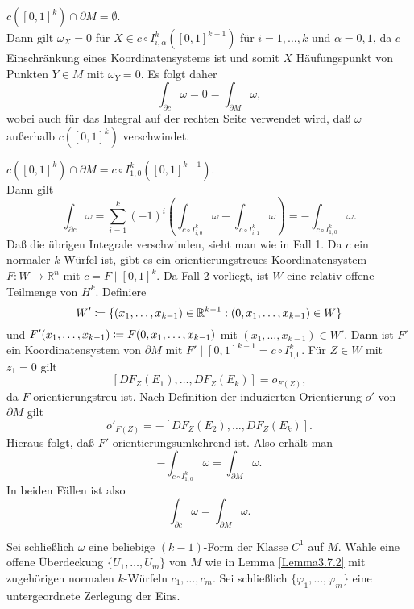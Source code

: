 \documentclass[a4paper,twoside,DIV15,BCOR12mm]{scrbook}
\begin{document}
\bigskip

 $c([0,1]^{k}) \cap \partial M = \emptyset$.\\


\noindent
Dann gilt $\omega_{X} = 0$ für $X \in c \circ 
I_{i,\alpha}^{k}([0,1]^{k-1})$ für $i = 1,\dots,k$ und $\alpha = 
0,1$, da $c$ Einschränkung eines Koordinatensystems ist und somit $X$ 
Häufungspunkt von Punkten $Y \in M$ mit $\omega_{Y} = 0$. Es folgt 
daher
\[ \int_{\partial c} \omega = 0 = \int_{\partial M} \omega, \]
wobei auch für das Integral auf der rechten Seite verwendet wird, daß
 $\omega$ außerhalb $c([0,1]^{k})$ verschwindet.

\bigskip

 $c([0,1]^{k}) \cap \partial M = c \circ 
I_{1,0}^{k}([0,1]^{k-1})$.\\

\noindent
Dann gilt
\[ \int_{\partial c} \omega = \sum_{i=1}^{k} (-1)^{i} \left(\int_{c 
\circ I_{i,0}^{k}} \omega - \int_{c \circ I_{i,1}^{k}} \omega 
\right) = -\int_{c \circ I_{1,0}^{k}} \omega. \]
Daß die übrigen Integrale verschwinden, sieht man wie in Fall 1. 
Da $c$ ein normaler $k$-Würfel ist, gibt es ein orientierungstreues 
Koordinatensystem $F: W \to {\mathbb R}^{n}$ mit $c = F \mid 
[0,1]^{k}$. Da Fall 2 vorliegt, ist $W$ eine relativ offene Teilmenge 
von $H^{k}$. Definiere
\[ W' \da  \{(x_{1},\dots,x_{k-1}) \in {\mathbb R}^{k-1}: 
(0,x_{1},\dots,x_{k-1}) \in W\} \]
und $F'(x_{1},\dots,x_{k-1}) \da  F(0,x_{1},\dots,x_{k-1})$ mit 
$(x_{1},\dots,x_{k-1}) \in W'$. Dann ist $F'$ ein Koordinatensystem 
von $\partial M$ mit $F' \mid [0,1]^{k-1} = c \circ I_{1,0}^{k}$. 
Für $Z \in W$ mit $z_{1} = 0$ gilt
\[ [DF_{Z} (E_{1}),\dots,DF_{Z}(E_{k})] = o_{F(Z)}, \]
da $F$ orientierungstreu ist. Nach Definition der induzierten 
Orientierung $o'$ von $\partial M$ gilt
\[ o'_{F(Z)} = -[DF_{Z}(E_{2}),\dots,DF_{Z}(E_{k})]. \]
Hieraus folgt, daß $F'$ orientierungsumkehrend ist. Also erhält man
\[ -\int_{c \circ I_{1,0}^{k}} \omega = \int_{\partial M} \omega. \]
In beiden Fällen ist also
\[ \int_{\partial c} \omega = \int_{\partial M} \omega. \]

\bigskip

\noindent
Sei schließlich $\omega$ eine beliebige $(k-1)$-Form der Klasse 
$C^{1}$ auf $M$. Wähle eine offene Überdeckung 
$\{U_{1},\dots,U_{m}\}$ von $M$ wie in Lemma \ref{Lemma3.7.2} mit zugehörigen 
normalen $k$-Würfeln $c_{1},\dots,c_{m}$. Sei schließlich 
$\{\varphi_{1},\dots,\varphi_{m}\}$ eine untergeordnete Zerlegung der 
Eins.\\
\end{document}
